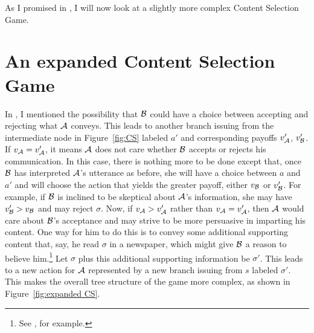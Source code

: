 As I promised in , I will now look at a slightly more complex Content Selection Game.

\section{An expanded Content Selection Game} \label{sec:expanded content selection game}

In , I mentioned the possibility that $\cal B$ could have a choice between accepting and rejecting what $\cal A$ conveys. This leads to another branch issuing from the intermediate node in Figure~\ref{fig:CS} labeled $a'$ and corresponding payoffs $v'_{\cal A}$, $v'_{\cal B}$. If $v_{\cal A} = v'_{\cal A}$, it means $\cal A$ does not care whether $\cal B$ accepts or rejects his communication. In this case, there is nothing more to be done except that, once $\cal B$ has interpreted $\cal A$'s utterance as before, she will have a choice between $a$ and $a'$ and will choose the action that yields the greater payoff, either $v_{\cal B}$ or $v'_{\cal B}$. For example, if $\cal B$ is inclined to be skeptical about $\cal A$'s information, she may have $v'_{\cal B} > v_{\cal B}$ and may reject $\sigma$. Now, if $v_{\cal A} > v'_{\cal A}$ rather than $v_{\cal A} = v'_{\cal A}$, then $\cal A$ would care about $\cal B$'s acceptance and may strive to be more persuasive in imparting his content. One way for him to do this is to convey some additional supporting content that, say, he read $\sigma$ in a newspaper, which might give $\cal B$ a reason to believe him.\footnote{See \citet{cialdini:i}, for example.} Let $\sigma$ plus this additional supporting information be $\sigma'$. This leads to a new action for $\cal A$ represented by a new branch issuing from $s$ labeled $\sigma'$. This makes the overall tree structure of the game more complex, as shown in Figure~\ref{fig:expanded CS}.


